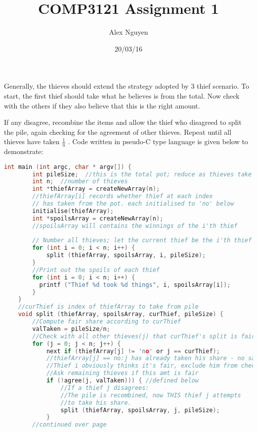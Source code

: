 \documentclass[11pt, a4paper]{article}
\title{COMP3121 Assignment 1}
\author{Alex Nguyen}
\date{20/03/16}
\begin{document}

Generally, the thieves should extend the strategy adopted by 3 thief scenario.
    To start, the first thief should take what he believes is from the total. Now check with the others if they also believe that this is the right amount.

    If any disagree, recombine the items and allow the thief who disagreed to split the pile, again checking for the agreement of other thieves. Repeat until all thieves have taken  \(\frac{1}{n}\) . Code written in pseudo-C type language is given below to demonstrate:
\begin{lstlisting}[frame = single, language =c]
    int main (int argc, char * argv[]) { 
        int pileSize;  //this is the total pot; reduce as thieves take 
        int n;  //number of thieves 
        int *thiefArray = createNewArray(n); 
        //thiefArray[i] records whether thief at each index 
        // has taken from the pot. each initialised to 'no' below
        initialise(thiefArray);  
        int *spoilsArray = createNewArray(n); 
        //spoilsArray will contains the winnings of the i'th thief
        
        // Number all thieves; let the current thief be the i'th thief
        for (int i = 0; i < n; i++) { 
            split (thiefArray, spoilsArray, i, pileSize); 
        } 
        //Print out the spoils of each thief 
        for (int i = 0; i < n; i++) { 
          printf ("Thief %d took %d things", i, spoilsArray[i]); 
        } 
    }
    //curThief is index of thiefArray to take from pile
    void split (thiefArray, spoilsArray, curThief, pileSize) {
        //Compute fair share according to curThief
        valTaken = pileSize/n;
        //Check with all other thieves(j) that curThief's split is fair 
        for (j = 0; j < n; j++) { 
            next if (thiefArray[j] != 'no' or j == curThief);
            //thiefArray[j] == no:j has already taken his share - no say
            //Thief i obviously thinks it's fair, exclude him from check 
            //Ask remaining thieves if this amt is fair
            if (!agree(j, valTaken))) { //defined below
                //If a thief j disagrees: 
                //The pile is recombined, now THIS thief j attempts 
                //to take his share. 
                split (thiefArray, spoilsArray, j, pileSize); 
            } 
        //continued over page
\end{lstlisting}
\end{document}
